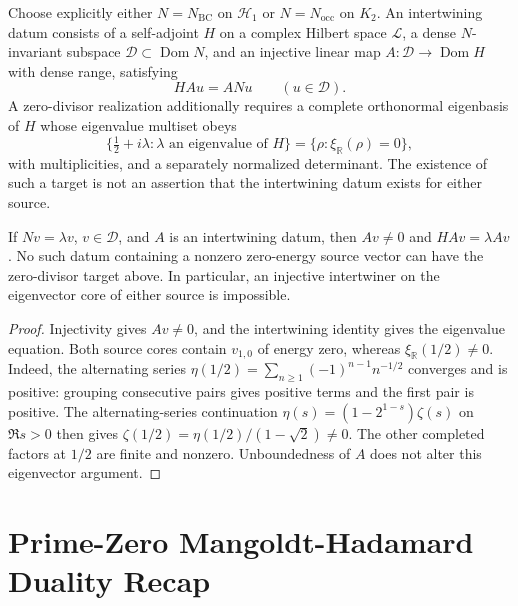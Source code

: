 \begin{definition}
\label{v4-arith:w9-r4:def:spectral-flow}
Choose explicitly either \(N=N_{\mathrm{BC}}\) on \(\mathcal H_1\)
or \(N=N_{\mathrm{occ}}\) on \(K_2\). An intertwining datum consists
of a self-adjoint \(H\) on a complex Hilbert space \(\mathcal L\),
a dense \(N\)-invariant subspace \(\mathcal D\subset\operatorname{Dom}N\),
and an injective linear map \(A:\mathcal D\to\operatorname{Dom}H\)
with dense range, satisfying
\begin{equation}
\label{v4-arith:w9-r4:eq:intertwine}
 HA u=ANu\qquad(u\in\mathcal D).
\end{equation}
A zero-divisor realization additionally requires a complete
orthonormal eigenbasis of \(H\) whose eigenvalue multiset obeys
\begin{equation}
\label{v4-arith:w9-r4:eq:spec-id}
 \{\tfrac12+i\lambda:\lambda\text{ an eigenvalue of }H\}
 =\{\rho:\xi_{\mathbb R}(\rho)=0\},
\end{equation}
with multiplicities, and a separately normalized determinant.
The existence of such a target is not an assertion that the
intertwining datum exists for either source.
\end{definition}

\begin{proposition}
\label{v4-arith:w9-r4:rem:unitarity-of-A}
If \(Nv=\lambda v\), \(v\in\mathcal D\), and \(A\) is an
intertwining datum, then \(Av\ne0\) and \(HAv=\lambda Av\).
No such datum containing a nonzero zero-energy source vector
can have the zero-divisor target above. In particular, an injective
intertwiner on the eigenvector core of either source is impossible.
\end{proposition}
\begin{proof}
Injectivity gives \(Av\ne0\), and the intertwining identity gives
the eigenvalue equation. Both source cores contain \(v_{1,0}\)
of energy zero, whereas \(\xi_{\mathbb R}(1/2)\ne0\).
Indeed, the alternating series
\(\eta(1/2)=\sum_{n\ge1}(-1)^{n-1}n^{-1/2}\) converges and is
positive: grouping consecutive pairs gives positive terms and
the first pair is positive. The alternating-series continuation
\(\eta(s)=(1-2^{1-s})\zeta(s)\) on \(\Re s>0\) then gives
\(\zeta(1/2)=\eta(1/2)/(1-\sqrt2)\ne0\).
The other completed factors at \(1/2\) are finite and nonzero.
Unboundedness of \(A\) does not alter this eigenvector argument.
\end{proof}

\section{Prime-Zero Mangoldt-Hadamard Duality Recap}
\label{v4-arith:w9-r4:mangoldt-hadamard}

